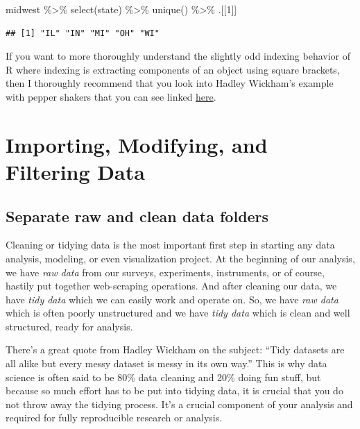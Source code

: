 \documentclass[
]{article}
\newenvironment{Shaded}{\begin{snugshade}}{\end{snugshade}}
\newcommand{\DecValTok}[1]{\textcolor[rgb]{0.00,0.00,0.81}{#1}}
\newcommand{\FunctionTok}[1]{\textcolor[rgb]{0.00,0.00,0.00}{#1}}
\newcommand{\NormalTok}[1]{#1}
\newcommand{\SpecialCharTok}[1]{\textcolor[rgb]{0.00,0.00,0.00}{#1}}
\begin{document}
\begin{Shaded}
\begin{Highlighting}[]
\NormalTok{midwest }\SpecialCharTok{\%\textgreater{}\%}
  \FunctionTok{select}\NormalTok{(state) }\SpecialCharTok{\%\textgreater{}\%}
  \FunctionTok{unique}\NormalTok{() }\SpecialCharTok{\%\textgreater{}\%}
\NormalTok{  .[[}\DecValTok{1}\NormalTok{]]}
\end{Highlighting}
\end{Shaded}

\begin{verbatim}
## [1] "IL" "IN" "MI" "OH" "WI"
\end{verbatim}

If you want to more thoroughly understand the slightly odd indexing behavior of R where indexing is extracting components of an object using square brackets, then I thoroughly recommend that you look into Hadley Wickham's example with pepper shakers that you can see linked \href{https://r4ds.had.co.nz/vectors.html\#lists-of-condiments}{here}.

\hypertarget{importing-modifying-and-filtering-data}{%
\section{Importing, Modifying, and Filtering Data}\label{importing-modifying-and-filtering-data}}

\hypertarget{separate-raw-and-clean-data-folders}{%
\subsection{Separate raw and clean data folders}\label{separate-raw-and-clean-data-folders}}

Cleaning or tidying data is the most important first step in starting any data analysis, modeling, or even visualization project. At the beginning of our analysis, we have \emph{raw data} from our surveys, experiments, instruments, or of course, hastily put together web-scraping operations. And after cleaning our data, we have \emph{tidy data} which we can easily work and operate on. So, we have \emph{raw data} which is often poorly unstructured and we have \emph{tidy data} which is clean and well structured, ready for analysis.

There's a great quote from Hadley Wickham on the subject: ``Tidy datasets are all alike but every messy dataset is messy in its own way.'' This is why data science is often said to be 80\% data cleaning and 20\% doing fun stuff, but because so much effort has to be put into tidying data, it is crucial that you do not throw away the tidying process. It's a crucial component of your analysis and required for fully reproducible research or analysis.
\end{document}
